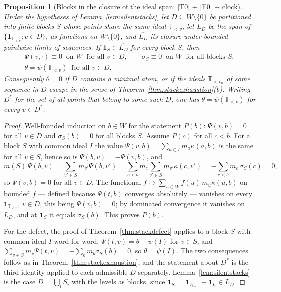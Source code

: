 \documentclass[11pt,a4paper]{article}
\theoremstyle{plain}
\newtheorem{proposition}[theorem]{Proposition}
\theoremstyle{definition}
\theoremstyle{remark}
\newcommand{\T}{\mathbb{T}}                     %
\newcommand{\one}{\mathbf{1}}
\begin{document}
\begin{proposition}[Blocks in the closure of the ideal span; \eqref{T0} + \eqref{E0} + clock]
  \label{prop:silentblocks}
  Under the hypotheses of Lemma~\ref{lem:silentstacks}, let
  $D \subseteq W \setminus \{0\}$ be partitioned into finite \emph{blocks}
  $S$ whose points share the same ideal $\T_{<v}$, let $L_D$ be the span of
  $\{\one_{\T_{<v}} : v \in D\}$, as functions on $W \setminus \{0\}$, and
  $\overline{L_D}$ its closure under bounded pointwise limits of sequences.
  If $\one_S \in \overline{L_D}$ for every block $S$, then
  \begin{gather*}
    \Psi(v,\cdot) \equiv 0 \ \text{ on } W \ \text{ for all } v \in D,
    \qquad
    \sigma_S \equiv 0 \ \text{ on } W \ \text{ for all blocks } S, \\
    \theta = \psi(\T_{<v}) \ \text{ for all } v \in D .
  \end{gather*}
  Consequently $\theta = 0$ if $D$ contains a minimal atom, or if the ideals
  $\T_{<v_n}$ of some sequence in $D$ escape in the sense of
  Theorem~\ref{thm:stackexhaustion}(b).  Writing $D^*$ for the set of all
  points that belong to some such $D$, one has $\theta = \psi(\T_{<v})$ for
  every $v \in D^*$.
\end{proposition}

\begin{proof}
  Well-founded induction on $b \in W$ for the statement $P(b)$:
  $\Psi(v,b) = 0$ for all $v \in D$ and $\sigma_S(b) = 0$ for all blocks $S$.
  Assume $P(c)$ for all $c < b$.  For a block $S$ with common ideal $I$ the
  value $\Psi(v,b) = \sum_{a \in I} m_a\kappa(a,b)$ is the same for all
  $v \in S$, hence so is $\Psi(b,v) = -\Psi(v,b)$, and
  \[
    m(S)\,\Psi(b,v)
      = \sum_{v' \in S} m_{v'}\Psi(b,v')
      = \sum_{c < b} m_c \sum_{v' \in S} m_{v'}\kappa(c,v')
      = -\sum_{c < b} m_c\,\sigma_S(c) = 0 ,
  \]
  so $\Psi(v,b) = 0$ for all $v \in D$.  The functional
  $f \mapsto \sum_{u \in W} f(u)\,m_u\kappa(u,b)$ on bounded $f$ --- defined
  because $\Psi(t,b)$ converges absolutely --- vanishes on every
  $\one_{\T_{<v}}$, $v \in D$, this being $\Psi(v,b) = 0$; by dominated
  convergence it vanishes on $\overline{L_D}$, and at $\one_S$ it equals
  $\sigma_S(b)$.  This proves $P(b)$.

  For the defect, the proof of Theorem~\ref{thm:stackdefect} applies to a
  block $S$ with common ideal $I$ word for word: $\Psi(t,v) = \theta - \psi(I)$
  for $v \in S$, and $\sum_{v \in S} m_v\Psi(t,v) = -\sum_b m_b\sigma_S(b) = 0$,
  so $\theta = \psi(I)$.  The two consequences follow as in
  Theorem~\ref{thm:stackexhaustion}, and the statement about $D^*$ is the
  third identity applied to each admissible $D$ separately.
  Lemma~\ref{lem:silentstacks} is the case $D = \bigcup_i S_i$ with the
  levels as blocks, since $\one_{S_i} = \one_{I_{i+1}} - \one_{I_i} \in L_D$.
\end{proof}
\end{document}
